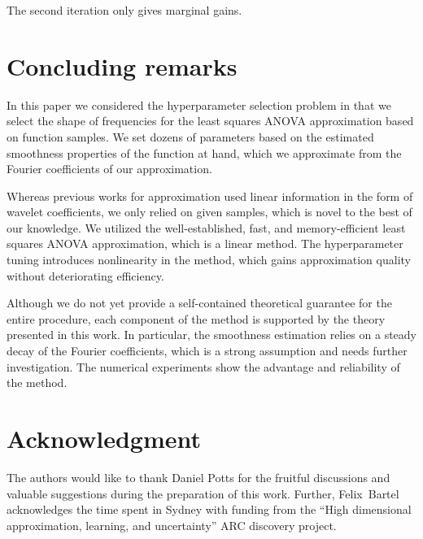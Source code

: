 \documentclass[a4paper]{scrartcl}
\numberwithin{equation}{section}
\begin{document}
The second iteration only gives marginal gains.

 \section{Concluding remarks}\label{sec:conclusion} 

In this paper we considered the hyperparameter selection problem in that we select the shape of frequencies for the least squares ANOVA approximation based on function samples.
We set dozens of parameters based on the estimated smoothness properties of the function at hand, which we approximate from the Fourier coefficients of our approximation.

Whereas previous works for approximation \cite{SUV21} used linear information in the form of wavelet coefficients, we only relied on given samples, which is novel to the best of our knowledge.
We utilized the well-established, fast, and memory-efficient least squares ANOVA approximation, which is a linear method.
The hyperparameter tuning introduces nonlinearity in the method, which gains approximation quality without deteriorating efficiency.

Although we do not yet provide a self-contained theoretical guarantee for the entire procedure, each component of the method is supported by the theory presented in this work.
In particular, the smoothness estimation relies on a steady decay of the Fourier coefficients, which is a strong assumption and needs further investigation.
The numerical experiments show the advantage and reliability of the method. 
\section*{Acknowledgment}

The authors would like to thank Daniel Potts for the fruitful discussions and valuable suggestions during the preparation of this work.
Further, Felix~Bartel acknowledges the time spent in Sydney with funding from the ``High dimensional approximation, learning, and uncertainty'' ARC discovery project.

\printbibliography
\end{document}
